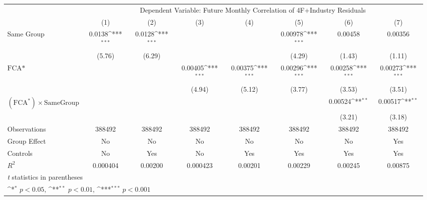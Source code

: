 {
\def\sym#1{\ifmmode^{#1}\else\(^{#1}\)\fi}
\begin{tabular}{l*{7}{c}}
\hline\hline
                &\multicolumn{7}{c}{Dependent Variable: Future Monthly Correlation of 4F+Industry Residuals}                                         \\\cmidrule(lr){2-8}
                &\multicolumn{1}{c}{(1)}         &\multicolumn{1}{c}{(2)}         &\multicolumn{1}{c}{(3)}         &\multicolumn{1}{c}{(4)}         &\multicolumn{1}{c}{(5)}         &\multicolumn{1}{c}{(6)}         &\multicolumn{1}{c}{(7)}         \\
\hline
Same Group      &   0.0138\sym{***}&   0.0128\sym{***}&                  &                  &  0.00978\sym{***}&  0.00458         &  0.00356         \\
                &   (5.76)         &   (6.29)         &                  &                  &   (4.29)         &   (1.43)         &   (1.11)         \\
[1em]
$ \text{FCA*} $ &                  &                  &  0.00405\sym{***}&  0.00375\sym{***}&  0.00296\sym{***}&  0.00258\sym{***}&  0.00273\sym{***}\\
                &                  &                  &   (4.94)         &   (5.12)         &   (3.77)         &   (3.53)         &   (3.51)         \\
[1em]
 $ (\text{FCA}^*) \times {\text{SameGroup} }  $ &                  &                  &                  &                  &                  &  0.00524\sym{**} &  0.00517\sym{**} \\
                &                  &                  &                  &                  &                  &   (3.21)         &   (3.18)         \\
\hline
Observations    &   388492         &   388492         &   388492         &   388492         &   388492         &   388492         &   388492         \\
Group Effect    &       No         &       No         &       No         &       No         &       No         &       No         &      Yes         \\
Controls        &       No         &      Yes         &       No         &      Yes         &      Yes         &      Yes         &      Yes         \\
$ R^2 $         & 0.000404         &  0.00200         & 0.000423         &  0.00201         &  0.00229         &  0.00245         &  0.00875         \\
\hline\hline
\multicolumn{8}{l}{\footnotesize \textit{t} statistics in parentheses}\\
\multicolumn{8}{l}{\footnotesize \sym{*} \(p<0.05\), \sym{**} \(p<0.01\), \sym{***} \(p<0.001\)}\\
\end{tabular}
}
